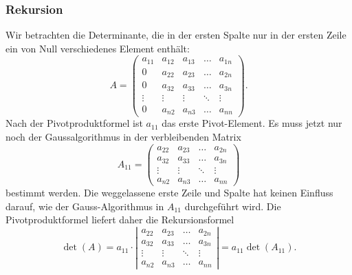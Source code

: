 \subsubsection{Rekursion}
Wir betrachten die Determinante, die in der ersten Spalte nur in der
ersten Zeile ein von Null verschiedenes Element enthält:
\[
A=
\begin{pmatrix}
a_{11}&a_{12}&a_{13}&\dots &a_{1n}\\
  0   &a_{22}&a_{23}&\dots &a_{2n}\\
  0   &a_{32}&a_{33}&\dots &a_{3n}\\
\vdots&\vdots&\vdots&\ddots&\vdots\\
  0   &a_{n2}&a_{n3}&\dots &a_{nn}
\end{pmatrix}.
\]
Nach der Pivotproduktformel ist $a_{11}$ das erste Pivot-Element.
Es muss jetzt nur noch der Gaussalgorithmus in der verbleibenden Matrix
\[
A_{11}
=
\begin{pmatrix}
a_{22}&a_{23}&\dots &a_{2n}\\
a_{32}&a_{33}&\dots &a_{3n}\\
\vdots&\vdots&\ddots&\vdots\\
a_{n2}&a_{n3}&\dots &a_{nn}
\end{pmatrix}
\]
bestimmt werden.
Die weggelassene erste Zeile und Spalte hat keinen Einfluss darauf, wie
der Gauss-Algorithmus in $A_{11}$ durchgeführt wird.
Die Pivotproduktformel liefert daher die Rekursionsformel
\begin{equation}
\det(A)
=
a_{11}\cdot
\left|\begin{matrix}
a_{22}&a_{23}&\dots &a_{2n}\\
a_{32}&a_{33}&\dots &a_{3n}\\
\vdots&\vdots&\ddots&\vdots\\
a_{n2}&a_{n3}&\dots &a_{nn}
\end{matrix} \right|
=
a_{11}
\det(A_{11}).
\label{determinante:entwicklungssatz:rekursion}
\end{equation}

